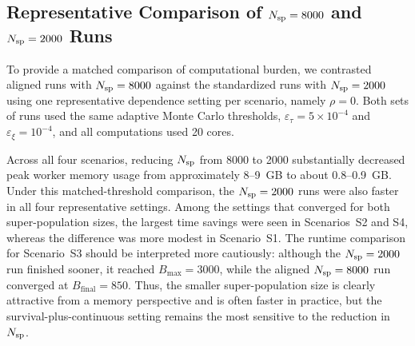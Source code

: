 \subsection{Representative Comparison of $N_{\textup{sp}}=8000$ and $N_{\textup{sp}}=2000$ Runs}\label{app:nsp8000_vs_2000}

To provide a matched comparison of computational burden, we contrasted aligned runs with $N_{\textup{sp}}=8000$ against the standardized runs with $N_{\textup{sp}}=2000$ using one representative dependence setting per scenario, namely $\rho=0$. Both sets of runs used the same adaptive Monte Carlo thresholds, $\varepsilon_{\tau}=5\times 10^{-4}$ and $\varepsilon_{\xi}=10^{-4}$, and all computations used 20 cores.

Across all four scenarios, reducing $N_{\textup{sp}}$ from 8000 to 2000 substantially decreased peak worker memory usage from approximately 8--9~GB to about 0.8--0.9~GB. Under this matched-threshold comparison, the $N_{\textup{sp}}=2000$ runs were also faster in all four representative settings. Among the settings that converged for both super-population sizes, the largest time savings were seen in Scenarios~S2 and S4, whereas the difference was more modest in Scenario~S1. The runtime comparison for Scenario~S3 should be interpreted more cautiously: although the $N_{\textup{sp}}=2000$ run finished sooner, it reached $B_{\max}=3000$, while the aligned $N_{\textup{sp}}=8000$ run converged at $B_{\text{final}}=850$. Thus, the smaller super-population size is clearly attractive from a memory perspective and is often faster in practice, but the survival-plus-continuous setting remains the most sensitive to the reduction in $N_{\textup{sp}}$.


